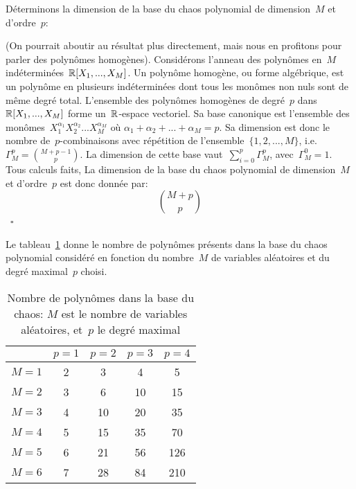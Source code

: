 \medskip
Déterminons la dimension de la base du chaos polynomial de dimension~$M$ et d'ordre~$p$:
\begin{demonstration}\footnotesize{}
(On pourrait aboutir au résultat plus directement, mais nous en profitons pour parler des polynômes homogènes). 
Considérons l'anneau des polynômes en~$M$ indéterminées~$\mathbb R[X_1, ..., X_M]$.
Un polynôme homogène, ou forme algébrique, est un polynôme en plusieurs indéterminées dont tous les monômes non nuls sont de même degré total. 
L'ensemble des polynômes homogènes de degré~$p$ dans~$\mathbb R[X_1, ..., X_M]$ forme un~$\mathbb R$-espace vectoriel. 
Sa base canonique est l'ensemble des monômes~$X_1^{\alpha_1}X_2^{\alpha_2}...X_M^{\alpha_M} \text{ où } \alpha_1+\alpha_2+...+\alpha_M=p$.
Sa dimension est donc le nombre de~$p$-combinaisons avec répétition de l'ensemble~$\{1, 2, ..., M\}$, i.e.~$\Gamma_M^p={M+p-1\choose p}$.
La dimension de cette base vaut~$\sum_{i=0}^p \Gamma_M^p$, avec~$\Gamma_M^0=1$.\normalsize{} \\
Tous calculs faits, La dimension de la base du chaos polynomial de dimension~$M$ et d'ordre~$p$ est donc donnée par:
\begin{equation}
{M+p\choose p}
\end{equation}\footnotesize{}~$\square$
\end{demonstration}
Le tableau~\ref{Tab-NbChaos} donne le nombre de polynômes présents dans la base du chaos polynomial considéré en fonction du nombre~$M$ de variables aléatoires et du degré maximal~$p$ choisi.
\begin{table}[htb]
\begin{center}
\begin{tabular}{c|cccc}
& $p=1$ & $p=2$ & $p=3$ & $p=4$\\
\hline
$M=1$ &2&3&4&5\\
$M=2$ &3&6&10&15\\
$M=3$ &4&10&20&35\\
$M=4$ &5&15&35&70\\
$M=5$ &6&21&56&126\\
$M=6$ &7&28&84&210
\end{tabular}
\end{center}
\caption{Nombre de polynômes dans la base du chaos: $M$ est le nombre de variables aléatoires, et~$p$ le degré maximal}\label{Tab-NbChaos}
\end{table}


